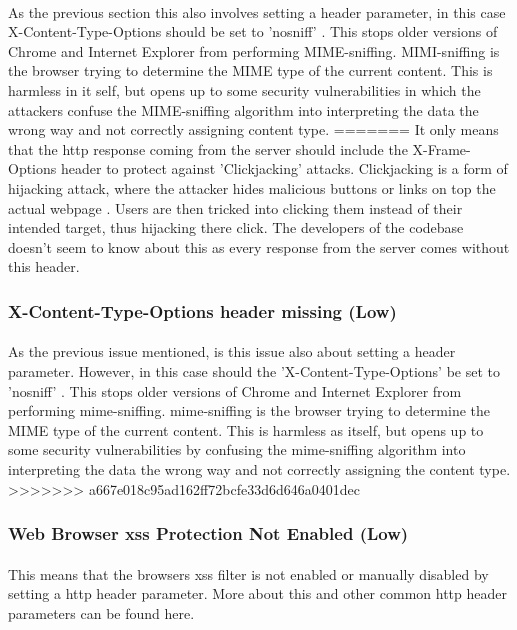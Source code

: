 \documentclass[11pt,english,a4paper]{report}
\begin{document}
\paragraph{}
As the previous section this also involves setting a header parameter, in this case X-Content-Type-Options should be set to 'nosniff' \cite{no-sniff}. 
This stops older versions of Chrome and Internet Explorer from performing MIME-sniffing. 
MIMI-sniffing is the browser trying to determine the MIME type of the current content. 
This is harmless in it self, but opens up to some security vulnerabilities in which the attackers confuse the MIME-sniffing algorithm into interpreting the data the wrong way and not correctly assigning content type.
=======
It only means that the \gls{http} response coming from the server should include the X-Frame-Options header to protect against 'Clickjacking' attacks.
Clickjacking is a form of hijacking attack, where the attacker hides malicious buttons or links on top the actual webpage \cite{clickjacking}.
Users are then tricked into clicking them instead of their intended target, thus hijacking there click.
The developers of the codebase doesn't seem to know about this as every response from the server comes without this header.

\subsubsection{X-Content-Type-Options header missing (Low)}
\paragraph{}
As the previous issue mentioned, is this issue also about setting a header parameter.
However, in this case should the 'X-Content-Type-Options' be set to 'nosniff' \cite{no-sniff}. 
This stops older versions of Chrome and Internet Explorer from performing \gls{mime}-sniffing. 
\gls{mime}-sniffing is the browser trying to determine the MIME type of the current content. 
This is harmless as itself, but opens up to some security vulnerabilities by confusing the \gls{mime}-sniffing algorithm into interpreting the data the wrong way and not correctly assigning the content type.
>>>>>>> a667e018c95ad162ff72bcfe33d6d646a0401dec

\subsubsection{Web Browser \gls{xss} Protection Not Enabled (Low)}
\paragraph{}
This means that the browsers \gls{xss} filter is not enabled or manually disabled by setting a \gls{http} header parameter.
More about this and other common \gls{http} header parameters can be found here\cite{important-headers}. 
\end{document}
